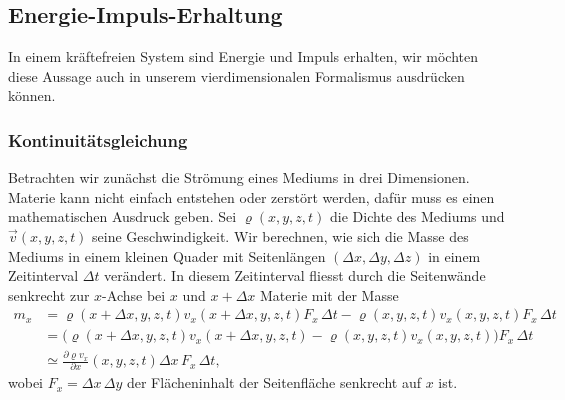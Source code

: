 \subsection{Energie-Impuls-Erhaltung}
%
In einem kräftefreien System sind Energie und Impuls erhalten, wir
möchten diese Aussage auch in unserem vierdimensionalen Formalismus
ausdrücken können.

\subsubsection{Kontinuitätsgleichung}
Betrachten wir zunächst die Strömung eines Mediums in drei Dimensionen.
Materie kann nicht einfach entstehen oder zerstört werden, dafür muss
es einen mathematischen Ausdruck geben.
Sei $\varrho(x,y,z,t)$ die Dichte des Mediums und $\vec v(x,y,z,t)$ 
seine Geschwindigkeit.
Wir berechnen, wie sich die Masse des Mediums in einem kleinen
Quader mit Seitenlängen $(\Delta x, \Delta y, \Delta z)$ in einem
Zeitinterval $\Delta t$ verändert.
In diesem Zeitinterval fliesst durch die Seitenwände senkrecht zur
$x$-Achse bei $x$ und $x+\Delta x$ 
Materie mit der Masse
\begin{align*}
m_x
&=
\varrho(x+\Delta x,y,z,t) v_x(x+\Delta x,y,z,t) F_x\,\Delta t
-\varrho(x,y,z,t) v_x(x,y,z,t) F_x\,\Delta t
\\
&=
\bigl(\varrho(x+\Delta x,y,z,t)
v_x(x+\Delta x,y,z,t) -\varrho(x,y,z,t) v_x(x,y,z,t)\bigr) F_x\,\Delta t
\\
&\simeq
\frac{\partial \varrho v_x}{\partial x}(x,y,z,t)\Delta x\, F_x\,\Delta t,
\end{align*}
wobei $F_x=\Delta x\,\Delta y$ der Flächeninhalt der Seitenfläche senkrecht
auf $x$ ist.

